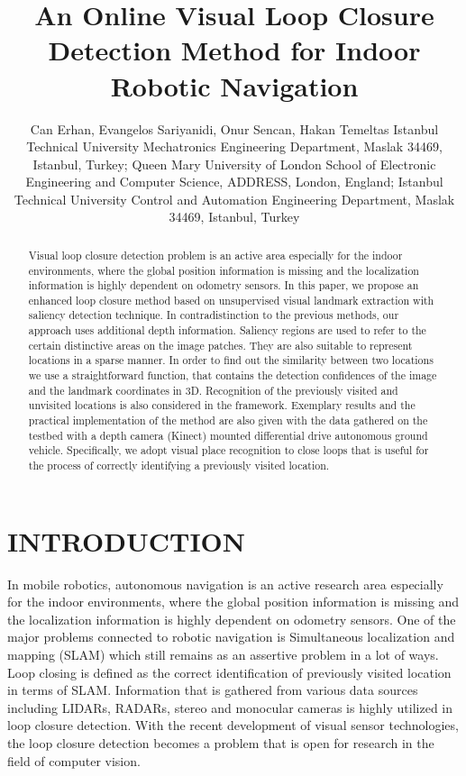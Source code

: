 \documentclass[]{spie}  %
\title{An Online Visual Loop Closure Detection Method for Indoor Robotic Navigation}
\author{
Can Erhan\supit{a}, 
Evangelos Sariyanidi\supit{b}, 
Onur Sencan\supit{c}, 
Hakan Temeltas\supit{c}
\skiplinehalf
\supit{a}Istanbul Technical University Mechatronics Engineering Department, Maslak 34469, Istanbul, Turkey; 
\supit{b}Queen Mary University of London School of Electronic Engineering and Computer Science, ADDRESS, London, England; 
\supit{c}Istanbul Technical University Control and Automation Engineering Department, Maslak 34469, Istanbul, Turkey
}
\begin{document}
 
\maketitle 

\begin{abstract}
Visual loop closure detection problem is an active area especially for the indoor environments, where the global position information is missing and the localization information is highly dependent on odometry sensors. In this paper, we propose an enhanced loop closure method based on unsupervised visual landmark extraction with saliency detection technique. In contradistinction to the previous methods, our approach uses additional depth information. Saliency regions are used to refer to the certain distinctive areas on the image patches. They are also suitable to represent locations in a sparse manner.  In order to find out the similarity between two locations we use a straightforward function, that contains the detection confidences of the image and the landmark coordinates in 3D. Recognition of the previously visited and unvisited locations is also considered in the framework. Exemplary results and the practical implementation of the method are also given with the data gathered on the testbed with a depth camera (Kinect) mounted differential drive autonomous ground vehicle. Specifically, we adopt visual place recognition to close loops that is useful for the process of correctly identifying a previously visited location. 
\end{abstract}



\section{INTRODUCTION}

In mobile robotics, autonomous navigation is an active research area especially for the indoor environments, where the global position information is missing and the localization information is highly dependent on odometry sensors. One of the major problems connected to robotic navigation is Simultaneous localization and mapping (SLAM) which still remains as an assertive problem in a lot of ways. Loop closing is defined as the correct identification of previously visited location in terms of SLAM. Information that is gathered from various data sources including LIDARs, RADARs, stereo       and monocular cameras is highly utilized in loop closure detection. With the recent development of visual sensor technologies, the loop closure detection becomes a problem that is open for research in the field of computer vision.
\end{document}
